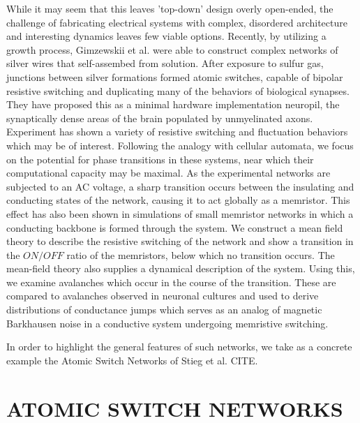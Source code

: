 \documentclass[aps,prl,preprint,groupedaddress]{revtex4-1}
\begin{document}
While it may seem that this leaves 'top-down' design overly open-ended, the
challenge of fabricating electrical systems with complex, disordered
architecture and interesting dynamics leaves few viable options.  Recently, by
utilizing a growth process, Gimzewskii et al. were able to construct
complex networks
of silver wires that self-assembed from  solution.  After exposure to sulfur
gas, junctions
between silver formations formed atomic switches, capable of bipolar resistive
switching and duplicating many of the behaviors of biological synapses.  They
have proposed this as a minimal hardware implementation neuropil, the
synaptically dense areas of the brain populated by unmyelinated axons.
Experiment has shown a variety of resistive switching and fluctuation
behaviors which may be of interest.  Following the analogy with cellular
automata, we focus on the potential for phase transitions in these systems,
near which their computational capacity may be maximal.  As the experimental
networks are subjected to an AC voltage, a sharp transition occurs between
the insulating and conducting states of the network, causing it to act
globally as a memristor.  This effect has also been shown in simulations of
small memristor networks in which a conducting backbone is formed through
the system.  We construct a mean field theory to describe the resistive
switching of the network and show a transition in the $ON/OFF$ ratio of
the memristors, below which no transition occurs.  The mean-field theory
also supplies a dynamical description of the system.  Using this, we examine
avalanches which occur in the course of the transition.  These are compared
to avalanches observed in neuronal cultures and used to derive distributions
of conductance jumps which serves as an analog of magnetic Barkhausen noise
in a conductive system undergoing memristive switching.

In order to highlight the general features of such networks, we take as
a concrete example the Atomic Switch Networks of Stieg et al. CITE.


\section{ATOMIC SWITCH NETWORKS}
\end{document}
